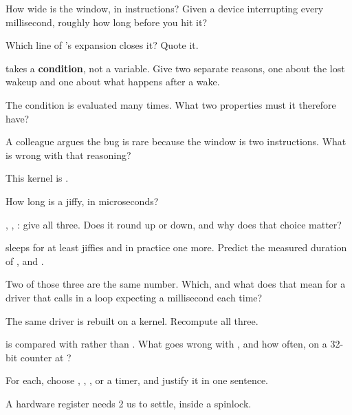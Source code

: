  How wide is the window, in instructions? Given a device interrupting every millisecond,
roughly how long before you hit it?

 Which line of 's expansion closes it? Quote it.

  takes a \textbf{condition}, not a variable. Give two
separate reasons, one about the lost wakeup and one about what happens after a wake.

 The condition is evaluated many times. What two properties must it therefore have?

 A colleague argues the bug is rare because the window is two instructions. What is wrong
with that reasoning?

\label{c9:ex:3}

This kernel is .

 How long is a jiffy, in microseconds?

 , , : give
all three. Does it round up or down, and why does that choice matter?

  sleeps for at least  jiffies and in practice one
more. Predict the measured duration of ,  and .

 Two of those three are the same number. Which, and what does that mean for a driver that
calls  in a loop expecting a millisecond each time?

 The same driver is rebuilt on a  kernel. Recompute all three.

  is compared with  rather than \code{>}. What goes wrong
with \code{>}, and how often, on a 32-bit counter at ?

\label{c9:ex:4}

For each, choose , , , or a timer, and justify it in
one sentence.

 A hardware register needs 2 us to settle, inside a spinlock.

